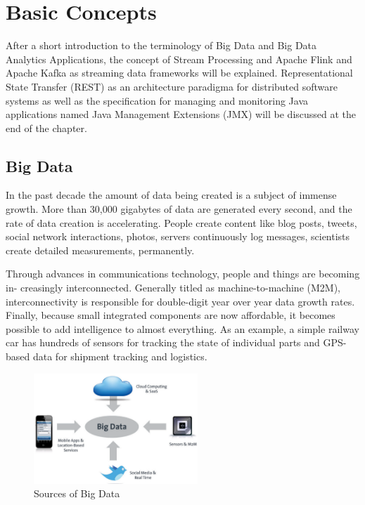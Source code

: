 \chapter{Basic Concepts}
\label{ch:basic-concepts}
After a short introduction to the terminology of Big Data and Big Data Analytics
Applications, the concept of Stream Processing and Apache Flink and Apache Kafka as
streaming data frameworks will be explained. Representational State Transfer (REST) as
an architecture paradigma for distributed software systems as well as the specification for
managing and monitoring Java applications named Java Management Extensions (JMX)
will be discussed at the end of the chapter.

\section{Big Data}
\label{sec:big-data}
In the past decade the amount of data being created is a subject of immense growth. More
than 30,000 gigabytes of data are generated every second, and the rate of data
creation is accelerating\cite{Marz15}. People create content like blog posts, tweets, social
network interactions, photos, servers continuously log messages, scientists create detailed
measurements, permanently.

Through advances in communications technology, people and things are becoming in-
creasingly interconnected. Generally titled as machine-to-machine (M2M), interconnectivity is
responsible for double-digit year over year data growth rates. Finally,
because small integrated components are now affordable, it becomes possible to add
intelligence to almost everything. As an example, a simple railway car has hundreds
of sensors for tracking the state of individual parts and GPS-based data for shipment
tracking and logistics\cite{Ziko12}.

\begin{figure}[H]
	\centering
	\includegraphics[width=0.55\textwidth]{../images/04-sources-of-bigdata.png}
	\caption{Sources of Big Data{\cite{Bitk12}}}
	\label{sources-of-bigdata}
\end{figure}

